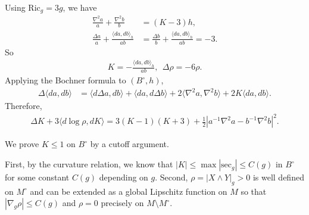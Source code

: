 \documentclass[letterpaper]{amsart}
\theoremstyle{definition}
\theoremstyle{remark}
\begin{document}
Using $\mathrm{Ric}_g = 3 g$, we have
\begin{align*}
	\frac{\nabla ^2 a}{a} + \frac{\nabla ^2 b}{b} &= (K-3) h,\\
	\frac{\Delta a}{a} + \frac{\langle d a, d b \rangle_h}{a b} &= \frac{\Delta b}{b} + \frac{\langle d a, d b \rangle_h}{a b} = -3.
\end{align*} 
So 
\begin{align*}
	K = - \frac{\langle d a, d b \rangle_h}{a b},\ \ \Delta \rho = - 6 \rho .
\end{align*} 
Applying the Bochner formula to $(B ^{\circ}, h)$,
\begin{align*}
	\Delta  \langle d a, d b \rangle &= \langle d \Delta a, d b \rangle + \langle d a, d \Delta b \rangle + 2 \langle \nabla ^2 a, \nabla ^2 b \rangle + 2K \langle d a, d b \rangle.
\end{align*} 
Therefore,
\begin{align*}
	\Delta K + 3 \langle d \log \rho , d K \rangle= 3 (K-1) (K+3)+ \frac{1}{2} \left| a ^{-1} \nabla ^2 a - b ^{-1} \nabla ^2 b \right|^2.
\end{align*} 

We prove $K\le1$ on $B^\circ$ by a cutoff argument.

First, by the curvature relation, we know that $|K| \leq \max| \mathrm{sec}_g| \leq  C(g)$ in $B ^{\circ}$ for some constant $C(g)$ depending on $g$. Second, $\rho = | X \wedge Y|_{g} >0 $ is well defined on $M ^{\circ}$ and can be extended as a global Lipschitz function on $M$ so that $|\nabla_g \rho |\leq C(g)$ and $\rho =0$ precisely on $M \setminus M ^{\circ}$.
\end{document}
